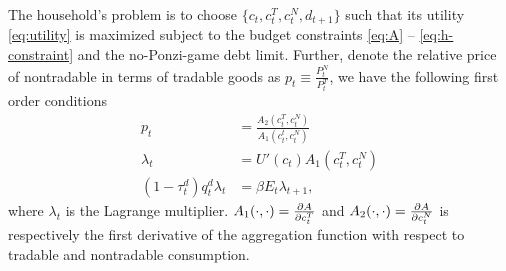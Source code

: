 The household's problem is to choose $\{c_t, c_t^T, c_t^N, d_{t+1}\}$ such that its utility \eqref{eq:utility} is maximized subject to the budget constraints \eqref{eq:A} -- \eqref{eq:h-constraint} and the no-Ponzi-game debt limit.
Further, denote the relative price of nontradable in terms of tradable goods as $p_t \equiv \frac{P^N_t}{P^T_t}$, we have the following first order conditions
\begin{subequations}
    \begin{align}
        p_t &= \frac{A_2(c_t^T, c_t^N)}{A_1(c_t^t, c_t^N)} \label{eq:FOC-HH-1} \\
        \lambda_t &= U'(c_t)A_1(c_t^T, c_t^N)\\
        (1-\tau_t^d)q_t^d \lambda_t &= \beta E_t \lambda_{t+1},
    \end{align}
\end{subequations}
where $\lambda_t$ is the Lagrange multiplier.
$A_1(\cdot, \cdot) = \pdv{A}{c^T_t}$ and $A_2(\cdot, \cdot) = \pdv{A}{c^N_t}$ is respectively the first derivative of the aggregation function with respect to tradable and nontradable consumption.
